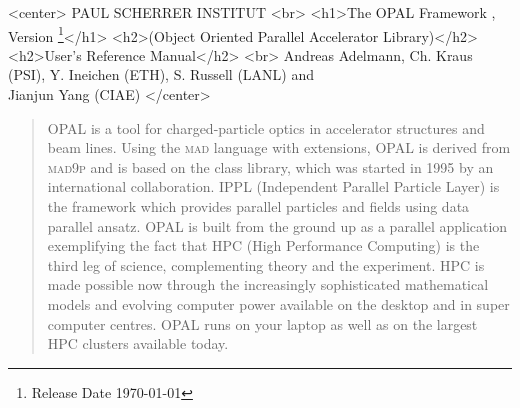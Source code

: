 \documentclass[12pt,a4paper]{report}
\newcommand{\opalversion}{\text{1.1.3 }}
\newcommand{\mad}{\textsc{mad }}
\newcommand{\madninep}{\textsc{mad9p }}
\newcommand{\opal}{\textsc{OPAL }}
\begin{document}
\begin{titlepage}

\begin{htmlonly}
\begin{rawhtml}
<center>
PAUL SCHERRER INSTITUT
<br>
<h1>The OPAL Framework , Version \opalversion \footnote{Release Date \today}</h1>
<h2>(Object Oriented Parallel Accelerator Library)</h2>
<h2>User's Reference Manual</h2>
<br>
Andreas Adelmann, Ch. Kraus (PSI), Y. Ineichen (ETH), S. Russell (LANL) and \\ Jianjun Yang (CIAE)
</center>
\end{rawhtml}
\end{htmlonly}

\begin{quotation}
\opal is a tool for charged-particle optics in
accelerator structures and beam lines. 
Using the \mad language with extensions, \opal is derived from \madninep and is based 
on the
 class library,
which was started in 1995 by an international collaboration.  IPPL (Independent Parallel Particle Layer) is
the framework which provides parallel particles and fields using data parallel ansatz. 
\opal is built from the ground up as a parallel application exemplifying the fact that HPC (High Performance Computing) 
is the third leg of science, complementing theory and the experiment. 
HPC is made possible now through the increasingly sophisticated mathematical models and evolving computer power available on the desktop
and in super computer centres. \opal runs on your laptop as well as on the largest HPC clusters available today.


\end{quotation}
\end{titlepage}
\end{document}
